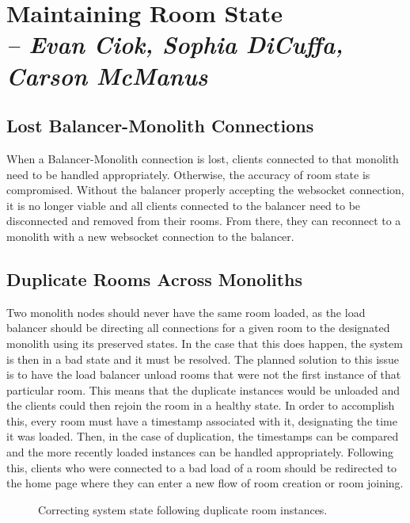 \chapter{Maintaining Room State \\
  \small{\textit{-- Evan Ciok, Sophia DiCuffa, Carson McManus}}
  \label{Chapter::RoomState}}

\section{Lost Balancer-Monolith Connections}

When a Balancer-Monolith connection is lost, clients connected to that monolith need to be handled appropriately. Otherwise, the accuracy of room state is compromised. 
Without the balancer properly accepting the websocket connection, it is no longer viable and all clients connected to the balancer need to be disconnected and removed 
from their rooms. From there, they can reconnect to a monolith with a new websocket connection to the balancer. 

\section{Duplicate Rooms Across Monoliths}

Two monolith nodes should never have the same room loaded, as the load balancer should be directing all connections for a given room to the designated monolith using its preserved states. 
In the case that this does happen, the system is then in a bad state and it must be resolved. The planned solution to this issue is to have the load balancer unload rooms that were not the 
first instance of that particular room. This means that the duplicate instances would be unloaded and the clients could then rejoin the room in a healthy state. In order to accomplish this, 
every room must have a timestamp associated with it, designating the time it was loaded. Then, in the case of duplication, the timestamps can be compared and the more recently loaded 
instances can be handled appropriately. Following this, clients who were connected to a bad load of a room should be redirected to the home page where they can enter a new flow of room 
creation or room joining. 

\begin{figure}[!htb]
  \centering
  \caption{\label{Figure::duplicate-rooms} Correcting system state following duplicate room instances.}
\end{figure}